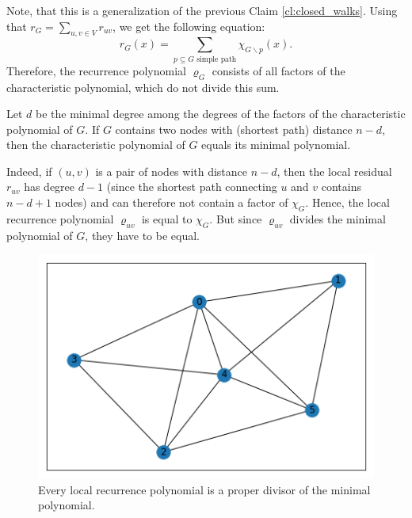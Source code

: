 \documentclass[a4paper,12pt]{article}
\begin{document}
Note, that this is a generalization of the previous Claim \ref{cl:closed_walks}. Using that $r_G = \sum_{u,v\in V}r_{uv}$, we get the following equation:
$$
r_G(x) = \sum_{p\subseteq G \text{ simple path}}\chi_{G\backslash p}(x).
$$
Therefore, the recurrence polynomial $\varrho_G$ consists of all factors of the characteristic polynomial, which do not divide this sum.

\begin{cor}
Let $d$ be the minimal degree among the degrees of the factors of the characteristic polynomial of $G$. If $G$ contains two nodes with (shortest path) distance $n-d$, then the characteristic polynomial of $G$ equals its minimal polynomial.
\end{cor}

Indeed, if $(u,v)$ is a pair of nodes with distance $n-d$, then the local residual $r_{uv}$ has degree $d-1$ (since the shortest path connecting $u$ and $v$ contains $n-d+1$ nodes) and can therefore not contain a factor of $\chi_G$. Hence, the local recurrence polynomial $\varrho_{uv}$ is equal to $\chi_G$. But since $\varrho_{uv}$ divides the minimal polynomial of $G$, they have to be equal.

\begin{figure}
\centering
\includegraphics[scale=0.5]{pics/graph2.png}
\caption{Every local recurrence polynomial is a proper divisor of the minimal polynomial.}
\label{fig:proper_div}
\end{figure}
\end{document}
